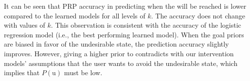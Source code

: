 \begin{table}[tpb]
\caption{Precision, Recall and F-scores for solving the Human-aware Intervention problem as a Plan Recognition problem with the Probabilistic Plan Recognition as Planning algorithm proposed by Ramirez and Geffener}
%
\label{tab:prp}
\end{table}


It can be seen that PRP accuracy in predicting when the \undesired will be reached is lower compared to the learned models for all levels of $k$.
The accuracy does not change with values of $k$. 
This observation is consistent with the accuracy of the logistic regression model (i.e., the best performing learned model).
When the goal priors are biased in favor of the undesirable state, the prediction accuracy slightly improves. 
However, giving a higher prior to \undesired contradicts with our intervention models' assumptions that the user wants to avoid the undesirable state, which implies that $P(\mathrm{u})$ must be low.


